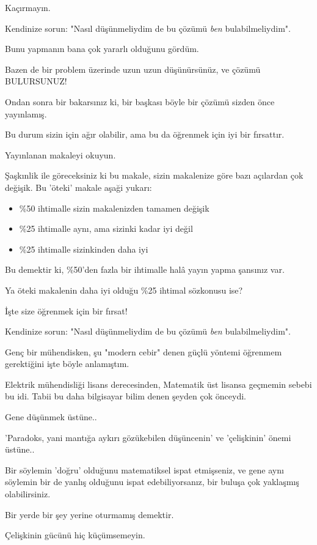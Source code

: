 \documentclass[12pt,fleqn]{article}\usepackage{../../common}
\begin{document}
Kaçırmayın.

Kendinize sorun: "Nasıl düşünmeliydim de bu çözümü {\em ben} bulabilmeliydim".

Bunu yapmanın bana çok yararlı olduğunu gördüm.

Bazen de bir problem üzerinde uzun uzun düşünürsünüz, ve çözümü BULURSUNUZ!

Ondan sonra bir bakarsınız ki, bir başkası böyle bir çözümü sizden önce
yayınlamış.

Bu durum sizin için ağır olabilir, ama bu da öğrenmek için iyi bir fırsattır.

Yayınlanan makaleyi okuyun.

Şaşkınlik ile göreceksiniz ki bu makale, sizin makalenize göre bazı
açılardan çok değişik. Bu 'öteki' makale aşaği yukarı:

\begin{itemize}
   \item \%50 ihtimalle sizin makalenizden tamamen değişik
   \item \%25 ihtimalle aynı, ama sizinki kadar iyi değil
   \item \%25 ihtimalle sizinkinden daha iyi
\end{itemize}

Bu demektir ki, \%50'den fazla bir ihtimalle halâ yayın yapma şansınız var.

Ya öteki makalenin daha iyi olduğu \%25 ihtimal sözkonusu ise?

İşte size öğrenmek için bir fırsat!

Kendinize sorun: "Nasıl düşünmeliydim de bu çözümü {\em ben} bulabilmeliydim".

Genç bir mühendisken, şu "modern cebir" denen güçlü yöntemi öğrenmem
gerektiğini işte böyle anlamıştım.

Elektrik mühendisliği lisans derecesinden, Matematik üst lisansa geçmemin
sebebi bu idi. Tabii bu daha bilgisayar bilim denen şeyden çok önceydi.

Gene düşünmek üstüne..

'Paradoks, yani mantığa aykırı gözükebilen düşüncenin' ve 'çelişkinin'
önemi üstüne..

Bir söylemin 'doğru' olduğunu matematiksel ispat etmişseniz, ve gene aynı
söylemin bir de yanlış olduğunu ispat edebiliyorsanız, bir buluşa çok
yaklaşmış olabilirsiniz.

Bir yerde bir şey yerine oturmamış demektir.

Çelişkinin gücünü hiç küçümsemeyin.
\end{document}
